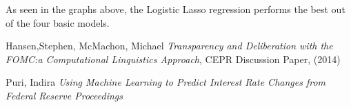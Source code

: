 \documentclass[11pt]{article}
\begin{document}
As seen in the graphs above, the Logistic Lasso regression performs the best out of the four basic models.


 
\begin{thebibliography}{99}

 Hansen,Stephen, McMachon, Michael  \emph{Transparency and Deliberation with the FOMC:a Computational Linquistics Approach}, CEPR Discussion Paper, (2014)

 Puri, Indira \emph{Using Machine Learning to Predict Interest Rate Changes from Federal Reserve Proceedings}
\end{thebibliography}
\end{document}
